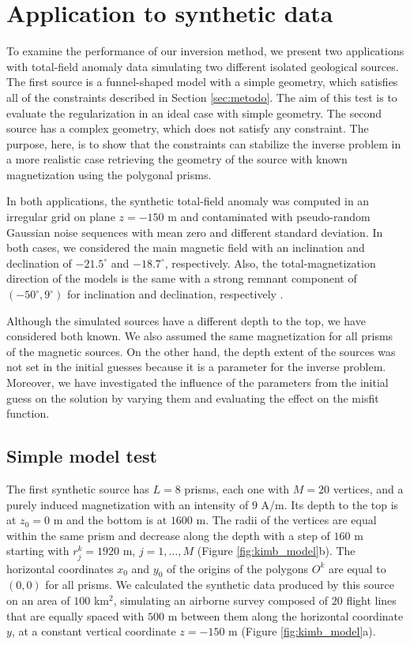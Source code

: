 \section{Application to synthetic data}

To examine the performance of our inversion method, we present two applications with total-field anomaly data simulating two different isolated geological sources. The first source is a funnel-shaped model with a simple geometry, which satisfies all of the constraints described in Section \ref{sec:metodo}. The aim of this test is to evaluate the regularization in an ideal case with simple geometry. The second source has a complex geometry, which does not satisfy any constraint. The purpose, here, is to show that the constraints can stabilize the inverse problem in a more realistic case retrieving the geometry of the source with known magnetization using the polygonal prisms.

In both applications, the synthetic total-field anomaly was computed in an irregular grid on plane $z=-150$ m and contaminated with pseudo-random Gaussian noise sequences with mean zero and different standard deviation. In both cases, we considered the main magnetic field with an inclination and declination of $-21.5^\circ$ and $-18.7^\circ$, respectively. Also, the total-magnetization direction of the models is the same with a strong remnant component of $(-50^\circ,9^\circ)$ for inclination and declination, respectively .

Although the simulated sources have a different depth to the top, we have considered both known. We also assumed the same magnetization for all prisms of the magnetic sources. On the other hand, the depth extent of the sources was not set in the initial guesses because it is a parameter for the inverse problem. Moreover, we have investigated the influence of the parameters from the initial guess on the solution by varying them and evaluating the effect on the misfit function.

\subsection{Simple model test}

The first synthetic source has $L=8$ prisms, each one with $M = 20$ vertices, and a purely induced magnetization with an intensity of $9$ A/m. Its depth to the top is at $z_0=0$ m and the bottom is at $1600$ m. The radii of the vertices are equal within the same prism and decrease along the depth with a step of $160$ m starting with $r_j^k=1920$ m, $j=1,\dots, M$ (Figure \ref{fig:kimb_model}b). The horizontal coordinates $x_0$ and $y_0$ of the origins of the polygons $O^k$ are equal to $(0,0)$ for all prisms. We calculated the synthetic data produced by this source on an area of $100$ km$^2$, simulating an airborne survey composed of $20$ flight lines that are equally spaced with $500$ m between them along the horizontal coordinate $y$, at a constant vertical coordinate $z=-150$ m (Figure \ref{fig:kimb_model}a).

